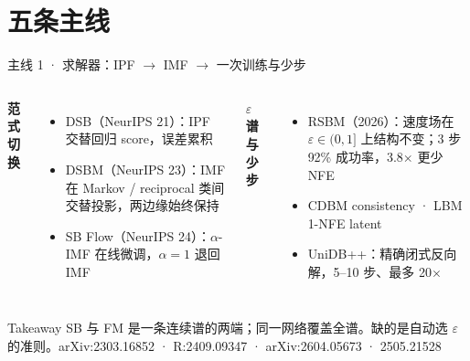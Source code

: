 \documentclass[aspectratio=169,10pt]{beamer}
\newcommand{\pos}[1]{\textcolor{positive}{#1}}\newcommand{\con}[1]{\textcolor{negative}{#1}}\newcommand{\HL}[1]{\textcolor{emphasis}{#1}}\newcommand{\new}[1]{\textcolor{sbred}{#1}}
\begin{document}
\section{五条主线}
\begin{frame}{主线 1 · 求解器：IPF $\to$ IMF $\to$ 一次训练与少步}
\begin{columns}[T]
\textbf{范式切换}
\begin{itemize}
\item DSB（NeurIPS 21）：IPF 交替回归 score，\con{误差累积}
\item DSBM（NeurIPS 23）：IMF 在 Markov / reciprocal 类间交替投影，\pos{两边缘始终保持}
\item SB Flow（NeurIPS 24）：$\alpha$-IMF 在线微调，$\alpha=1$ 退回 IMF
\end{itemize}
\textbf{$\varepsilon$ 谱与少步}
\begin{itemize}
\item \new{RSBM（2026）}：速度场在 $\varepsilon\in(0,1]$ 上结构不变；3 步 92\% 成功率，3.8$\times$ 更少 NFE
\item CDBM consistency · LBM 1-NFE latent
\item \new{UniDB++}：精确闭式反向解，5--10 步、最多 20$\times$
\end{itemize}
\end{columns}
\vspace{6pt}
\begin{alertblock}{Takeaway}
SB 与 FM 是一条连续谱的两端；同一网络覆盖全谱。缺的是自动选 $\varepsilon$ 的准则。\hfill{\small arXiv:2303.16852 · R:2409.09347 · arXiv:2604.05673 · 2505.21528}
\end{alertblock}
\end{frame}
\end{document}
